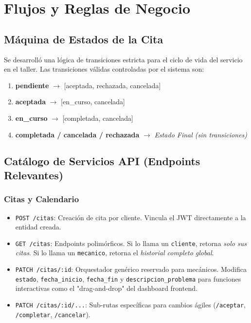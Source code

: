 \documentclass[12pt,a4paper]{article}
\begin{document}
\section{Flujos y Reglas de Negocio}

\subsection{Máquina de Estados de la Cita}
Se desarrolló una lógica de transiciones estricta para el ciclo de vida del servicio en el taller.
Las transiciones válidas controladas por el sistema son:
\begin{enumerate}
    \item \textbf{pendiente} $\rightarrow$ [aceptada, rechazada, cancelada]
    \item \textbf{aceptada} $\rightarrow$ [en\_curso, cancelada]
    \item \textbf{en\_curso} $\rightarrow$ [completada, cancelada]
    \item \textbf{completada / cancelada / rechazada} $\rightarrow$ \textit{Estado Final (sin transiciones)}
\end{enumerate}

\subsection{Catálogo de Servicios API (Endpoints Relevantes)}

\subsubsection{Citas y Calendario}
\begin{itemize}
    \item \texttt{POST /citas}: Creación de cita por cliente. Vincula el JWT directamente a la entidad creada.
    \item \texttt{GET /citas}: Endpoints polimórficos. Si lo llama un \texttt{cliente}, retorna \textit{solo sus citas}. Si lo llama un \texttt{mecanico}, retorna el \textit{historial completo global}.
    \item \texttt{PATCH /citas/:id}: Orquestador genérico reservado para mecánicos. Modifica \texttt{estado}, \texttt{fecha\_inicio}, \texttt{fecha\_fin} y \texttt{descripcion\_problema} para funciones interactivas como el "drag-and-drop" del dashboard frontend.
    \item \texttt{PATCH /citas/:id/...}: Sub-rutas específicas para cambios ágiles (\texttt{/aceptar}, \texttt{/completar}, \texttt{/cancelar}).
\end{itemize}
\end{document}
